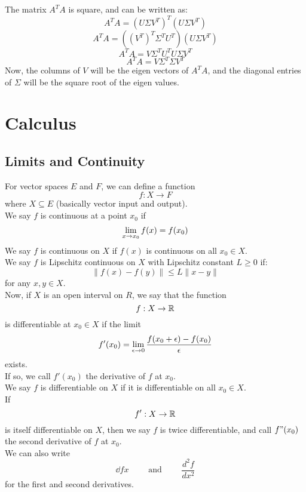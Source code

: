 \documentclass[12pt]{article}
\begin{document}
    The matrix $A^TA$ is square, 
    and can be written as:
    \[A^TA =  (U\Sigma V^T)^T(U\Sigma V^T)\]
    \[A^TA =  ((V^T)^T\Sigma^TU^T)(U\Sigma V^T)\]
    \[A^TA =  V\Sigma^TU^TU\Sigma V^T \]
    \[A^TA =  V\Sigma^T\Sigma V^T\]
    Now, the columns of $V$
    will be the eigen vectors of $A^TA$,
    and the diagonal entries of $\Sigma$
    will be the square root of the eigen values. \\
 
    \newpage

    \section*{Calculus}

    \subsection*{Limits and Continuity}

    For vector spaces $E$ and $F$,
    we can define a function
    \[ f: X \to F \]
    where $X \subseteq E$
    (basically vector input and output). \\

    We say $f$ is continuous at a point $x_0$
    if
    \[ \lim_{x \to x_0} f(x) = f(x_0) \]
    We say $f$ is continuous on $X$
    if $f(x)$ is continuous on all $x_0 \in X$. \\

    We say $f$ is Lipschitz continuous on $X$
    with Lipschitz constant $L \geq 0$ if: 
    \[ \| f(x) - f(y) \| \leq L \| x - y \| \]
    for any $x, y \in X$. \\

    Now, if $X$ is an open interval on $R$,
    we say that the function
    \[ f: X \to \mathbb{R} \]
    is differentiable at $x_0 \in X$ if the limit
    \[ f'(x_0) = \lim_{\epsilon \to 0} 
        \dfrac{f(x_0+\epsilon) - f(x_0)}{\epsilon}
   \]
    exists. \\
    If so, we call $f'(x_0)$
    the derivative of $f$ at $x_0$. \\
    We say $f$ is differentiable on $X$
    if it is differentiable on all $x_0 \in X$. \\

    If
    \[f': X \to \mathbb{R} \]
    is itself differentiable on $X$,
    then we say $f$ is twice differentiable,
    and call $f"(x_0)$ the second derivative
    of $f$ at $x_0$. \\

    We can also write
    \[ \dd{f}{x} \qquad \text{ and } \qquad \dfrac{d^2f}{dx^2} \]
    for the first and second derivatives. \\
\end{document}

